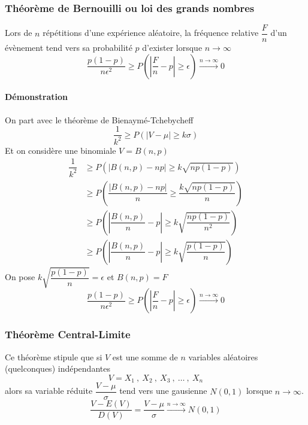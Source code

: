 \newpage
\subsubsection{Théorème de Bernouilli ou loi des grands nombres}
Lors de $n$ répétitions d'une expérience aléatoire, la fréquence relative $\dfrac{F}{n}$ d'un évènement tend vers sa probabilité $p$ d'exister lorsque $n\rightarrow\infty$
$$\boxed{\dfrac{p(1-p)}{n\epsilon^2} \geq P\left(\left|\dfrac{F}{n}-p\right|\geq\epsilon\right) \stackrel{n\rightarrow\infty}{\rightarrow} 0}$$
\paragraph{Démonstration}
On part avec le théorème de Bienaymé-Tchebycheff
$$\dfrac{1}{k^2} \geq P(|V-\mu|\geq k\sigma)$$
Et on considère une binomiale $V = B(n,p)$
\begin{align*}
	\dfrac{1}{k^2} &\geq P\left(\left|B(n,p)-np\right|\geq k\sqrt{np(1-p)}\right)\\
                   &\geq P\left(\dfrac{\left|B(n,p)-np\right|}{n}\geq \dfrac{k\sqrt{np(1-p)}}{n}\right)\\
                   &\geq P\left(\left|\dfrac{B(n,p)}{n}-p\right|\geq k\sqrt{\dfrac{np(1-p)}{n^2}}\right)\\
                   &\geq P\left(\left|\dfrac{B(n,p)}{n}-p\right|\geq k\sqrt{\dfrac{p(1-p)}{n}}\right)
\end{align*}
On pose $k\sqrt{\dfrac{p(1-p)}{n}} = \epsilon$ et $B(n,p) = F$
$$\boxed{\dfrac{p(1-p)}{n\epsilon^2} \geq P\left(\left|\dfrac{F}{n}-p\right|\geq\epsilon\right) \stackrel{n\rightarrow\infty}{\rightarrow} 0}$$







\newpage
\subsubsection{Théorème Central-Limite}
Ce théorème stipule que si $V$ est une somme de $n$ variables aléatoires (quelconques) indépendantes
$$V = X_1\ ,\ X_2\ ,\ X_3\ ,\ \dots\ ,\ X_n$$
alors sa variable réduite $\dfrac{V-\mu}{\sigma}$ tend vers une gausienne $N(0,1)$ lorsque $n\rightarrow\infty$.
$$\boxed{\dfrac{V-E(V)}{D(V)} = \dfrac{V-\mu}{\sigma} \stackrel{n\rightarrow\infty}{\rightarrow} N(0,1)}$$
